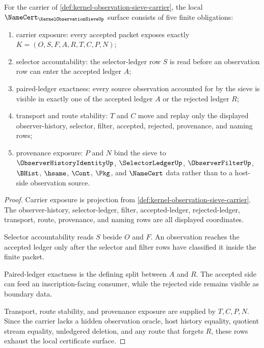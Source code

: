 \begin{theorem}
\label{thm:kernel-observation-sieve-namecert-obligations}
For the carrier of \autoref{def:kernel-observation-sieve-carrier}, the local $\NameCert_{\KernelObservationSieveUp}$ surface consists of five finite obligations:
\begin{enumerate}
\item carrier exposure: every accepted packet exposes exactly $K=(O,S,F,A,R,T,C,P,N)$;
\item selector accountability: the selector-ledger row $S$ is read before an observation row can enter the accepted ledger $A$;
\item paired-ledger exactness: every source observation accounted for by the sieve is visible in exactly one of the accepted ledger $A$ or the rejected ledger $R$;
\item transport and route stability: $T$ and $C$ move and replay only the displayed observer-history, selector, filter, accepted, rejected, provenance, and naming rows;
\item provenance exposure: $P$ and $N$ bind the sieve to $\ObserverHistoryIdentityUp$, $\SelectorLedgerUp$, $\ObserverFilterUp$, $\BHist$, $\hsame$, $\Cont$, $\Pkg$, and $\NameCert$ data rather than to a host-side observation source.
\end{enumerate}
\end{theorem}
\begin{proof}
Carrier exposure is projection from \autoref{def:kernel-observation-sieve-carrier}. The observer-history, selector-ledger, filter, accepted-ledger, rejected-ledger, transport, route, provenance, and naming rows are all displayed coordinates.

Selector accountability reads $S$ beside $O$ and $F$. An observation reaches the accepted ledger only after the selector and filter rows have classified it inside the finite packet.

Paired-ledger exactness is the defining split between $A$ and $R$. The accepted side can feed an inscription-facing consumer, while the rejected side remains visible as boundary data.

Transport, route stability, and provenance exposure are supplied by $T,C,P,N$. Since the carrier lacks a hidden observation oracle, host history equality, quotient stream equality, unledgered deletion, and any route that forgets $R$, these rows exhaust the local certificate surface.
\end{proof}

